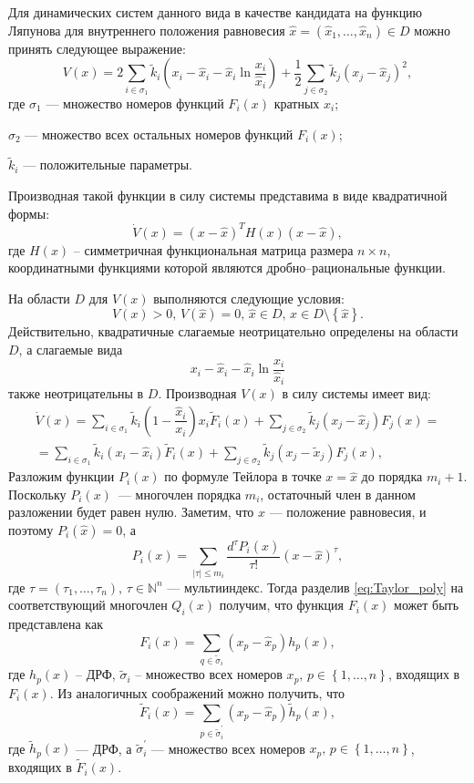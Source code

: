 \documentclass[14pt,a4paper]{extarticle}
\begin{document}
	Для динамических систем данного вида в качестве кандидата на функцию Ляпунова для внутреннего положения равновесия $\hat{x}=(\hat{x}_1,\ldots,\hat{x}_n)\in D$ можно принять следующее выражение:
	\[V(x)=2\sum\limits_{i\in\sigma_1}\tilde{k}_i\left(x_i-\hat{x}_i-\hat{x}_i\ln\dfrac{x_i}{\hat{x}_i}\right) + \dfrac{1}{2}\sum\limits_{j\in\sigma_2}\tilde{k}_j\left(x_j-\hat{x}_j\right)^2,\]
	где $\sigma_1$ --- множество номеров функций $F_i(x)$ кратных $x_i$;
	
	$\sigma_2$ --- множество всех остальных номеров функций $F_i(x)$;
	
	$\tilde{k}_i$ --- положительные параметры. 
	
	Производная такой функции в силу системы представима в виде квадратичной формы:
	\[\dot{V}(x)=(x-\hat{x})^{T}H(x)(x-\hat{x}),\]
	где $H(x)$ -- симметричная функциональная матрица размера $n\times n$, координатными функциями которой являются дробно--рациональные функции. 
	
	На области $D$ для $V(x)$ выполняются следующие условия:
	\[V(x)>0,\, V(\hat{x})=0,\, \hat{x}\in D,\,x\in D\setminus\left\{\hat{x}\right\}.\]
	Действительно, квадратичные слагаемые неотрицательно определены на области $D$, а слагаемые вида
	\[x_i-\hat{x}_i-\hat{x}_i\ln\dfrac{x_i}{\hat{x}_i}\] 
	также неотрицательны в $D$. Производная $V(x)$ в силу системы имеет вид:
	\begin{multline*}
		\dot{V}(x)=\sum\limits_{i\in\sigma_1}\tilde{k}_i\left(1-\dfrac{\hat{x}_i}{x_i}\right)x_i\tilde{F}_i(x)+\sum\limits_{j\in\sigma_2}\tilde{k}_j(x_j-\hat{x}_j)F_j(x)=\\
		=\sum\limits_{i\in\sigma_1}\tilde{k}_i(x_i-\hat{x}_i)\tilde{F}_i(x)+\sum\limits_{j\in\sigma_2}\tilde{k}_j(x_j-\tilde{x}_j)F_j(x),
	\end{multline*}
	Разложим функции $P_i(x)$ по формуле Тейлора в точке $x=\hat{x}$ до порядка $m_i+1$. Поскольку $P_i(x)$~--- многочлен порядка $m_i$, остаточный член в данном разложении будет равен нулю. Заметим, что $\hat{x}$ --- положение равновесия, и поэтому $P_i(\hat{x})=0$, а
	\begin{equation}\label{eq:Taylor_poly}
		P_i(x) = \sum\limits_{|\tau|\le m_i}\dfrac{d^{\tau}{P}_i(\hat{x})}{\tau!}(x-\hat{x})^{\tau},
	\end{equation}
	где $\tau = (\tau_1,\ldots,\tau_n),\,\tau\in\mathbb{N}^{n}$ --- мультииндекс. Тогда разделив \ref{eq:Taylor_poly} на соответствующий многочлен $Q_i(x)$ получим, что функция $F_i(x)$ может быть представлена как
	\[F_i(x)=\sum\limits_{q\in\tilde{\sigma}_i}(x_p-\hat{x}_p)h_p(x),\]  
	где $h_p(x)$ -- ДРФ, $\tilde{\sigma}_i$ -- множество всех номеров $x_p,\, p\in\left\{1,\ldots,n\right\}$, входящих в $F_i(x)$. Из аналогичных соображений можно получить, что 
	\[
	\tilde{F}_i(x)=\sum\limits_{p\in\tilde{\sigma}^\prime_i}(x_p-\hat{x}_p)\tilde{h}_p(x),\]
	где $\tilde{h}_p(x)$ --- ДРФ, а $\tilde{\sigma}^\prime_i$ --- множество всех номеров $x_p,\, p\in\left\{1,\ldots,n\right\}$, входящих в $\tilde{F}_i(x)$.
	
\end{document}
